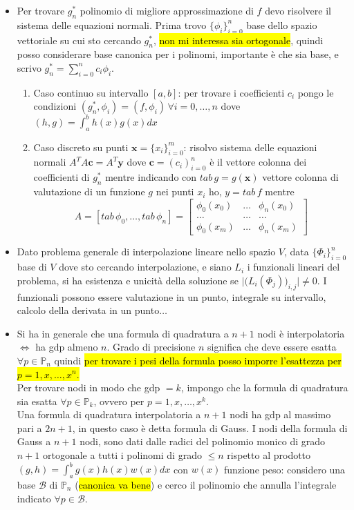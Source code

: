 \documentclass[a4paper,10pt]{article}
\theoremstyle{definition}
\newcommand{\numberset}{\mathbb} %
\theoremstyle{indentdefinition}
\theoremstyle{indenttheorem}
\theoremstyle{myremark}
\theoremstyle{indentgeneral}
\theoremstyle{plain}
\theoremstyle{plain}
\begin{document}
\begin{itemize}
    \item Per trovare $g_n^\ast$ polinomio di migliore approssimazione di $f$ devo risolvere il sistema delle equazioni normali. Prima trovo $\{\phi_i\}_{i=0}^n$ base dello spazio vettoriale su cui sto cercando $g_n^\ast$, \hl{non mi interessa sia ortogonale}, quindi posso considerare base canonica per i polinomi, importante è che sia base, e scrivo $g_n^\ast = \sum_{i=0}^nc_i\phi_i$.
    \begin{enumerate}
        \item Caso continuo su intervallo $[a,b]$: per trovare i coefficienti
        $c_i$ pongo le condizioni $(g_n^\ast,\phi_i)=(f,\phi_i) \,\forall i=0,\dots,n$ dove $(h,g)=\int_a^bh(x)g(x)dx$
        \item Caso discreto su punti $\mathbf{x} = \{ x_i \}_{i=0}^m$: risolvo sistema delle equazioni normali $A^TA\mathbf{c}=A^T \mathbf{y}$ dove $\mathbf{c} =(c_i)_{i=0}^n$ è il vettore colonna dei coefficienti di $g_n^\ast$ mentre indicando con $tab\,g = g(\mathbf{x})$ vettore colonna di valutazione di un funzione $g$ nei punti $x_i$ ho, $y = tab\,f$ mentre
        \[
        A = [ tab\,\phi_0,\dots,tab\,\phi_n] =
        \begin{bmatrix}
        \phi_0(x_0) & \dots & \phi_n(x_0) \\
        \dots & \dots & \dots \\
        \phi_0(x_m) & \dots & \phi_n(x_m)
        \end{bmatrix}
        \]
    \end{enumerate}
    
    \item Dato problema generale di interpolazione lineare nello spazio $V$, data $\{ \Phi_i \}_{i=0}^n$ base di $V$ dove sto cercando interpolazione, e siano $L_i$ i funzionali lineari del problema, si ha esistenza e unicità della soluzione se
    $\big|\bigl( L_i(\Phi_j) \bigr)_{i,j}\big| \ne 0$.
    I funzionali possono essere valutazione in un punto, integrale su intervallo, calcolo della derivata in un punto$\dots$

    \item Si ha in generale che una formula di quadratura a $n+1$ nodi è interpolatoria $\iff$ ha gdp almeno $n$. Grado di precisione $n$ significa che deve essere esatta $\forall p \in \numberset{P}_n$ quindi \hl{per trovare i pesi della formula posso imporre l'esattezza per $p=1,x,\dots,x^n$.} \\
    Per trovare nodi in modo che gdp $= k$, impongo che la formula di quadratu\-ra sia esatta $\forall p \in \numberset{P}_k$, ovvero per $p=1,x,\dots,x^k$. \\
    Una formula di quadratura interpolatoria a $n+1$ nodi ha gdp al massimo pari a $2n+1$, in questo caso è detta formula di Gauss.
    I nodi della formula di Gauss a $n+1$ nodi, sono dati dalle radici del polinomio monico di grado $n+1$ ortogonale a tutti i polinomi di grado $\le n$ rispetto al prodotto
    $(g,h) = \int_a^b g(x)h(x)w(x)dx$ con $w(x)$ funzione peso: considero una base $\mathcal{B}$ di $\numberset{P}_n$ (\hl{canonica va bene}) e cerco il polinomio che annulla l'integrale indicato $\forall p \in \mathcal{B}$.


\end{itemize}
\end{document}
